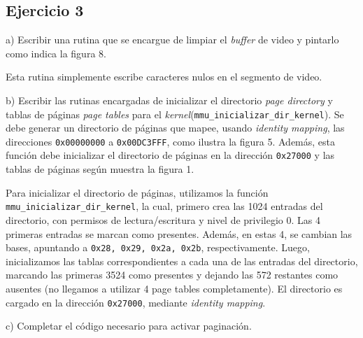 \newpage





\subsection*{Ejercicio 3}
\vspace*{0.5cm}

\noindent
a) Escribir una rutina que se encargue de limpiar el \textit{buffer} de video y pintarlo como indica la figura 8.

\vspace*{0.3cm}

Esta rutina simplemente escribe caracteres nulos en el segmento de video.

\vspace*{0.5cm} \noindent



\noindent
b) Escribir las rutinas encargadas de inicializar el directorio \textit{page directory} y tablas de páginas \textit{page tables} 
para el \textit{kernel}\newline (\verb|mmu_inicializar_dir_kernel|). Se debe generar un directorio de páginas que mapee, 
usando \textit{identity mapping}, las direcciones \verb|0x00000000| a \verb|0x00DC3FFF|, como ilustra la figura 5. 
Además, esta función debe inicializar el directorio de páginas en la dirección \verb|0x27000| y las tablas de páginas según muestra la figura 1.

\vspace*{0.3cm}

Para inicializar el directorio de p\'aginas, utilizamos la funci\'on \verb|mmu_inicializar_dir_kernel|, la cual, 
primero crea las 1024 entradas del directorio, con permisos de lectura/escritura y nivel de privilegio 0. Las 4 
primeras entradas se marcan como presentes. Adem\'as, en estas 4, se cambian las bases, apuntando a \verb|0x28, 0x29, 0x2a, 0x2b|, 
respectivamente. Luego, inicializamos las tablas correspondientes a cada una de las entradas del directorio, marcando 
las primeras 3524 como presentes y dejando las 572 restantes como ausentes (no llegamos a utilizar 4 page tables completamente). 
El directorio es cargado en la direcci\'on \verb|0x27000|, mediante \textit{identity mapping}.

\vspace*{0.5cm} \noindent



\noindent
c) Completar el código necesario para activar paginación.

